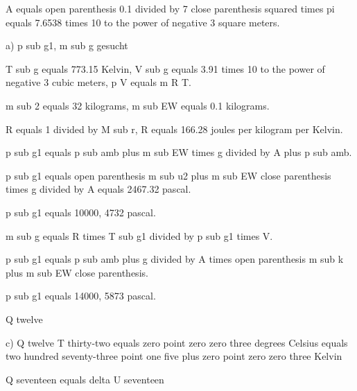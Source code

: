 A equals open parenthesis 0.1 divided by 7 close parenthesis squared times pi equals 7.6538 times 10 to the power of negative 3 square meters.

a) p sub g1, m sub g gesucht

T sub g equals 773.15 Kelvin, V sub g equals 3.91 times 10 to the power of negative 3 cubic meters, p V equals m R T.

m sub 2 equals 32 kilograms, m sub EW equals 0.1 kilograms.

R equals 1 divided by M sub r, R equals 166.28 joules per kilogram per Kelvin.

p sub g1 equals p sub amb plus m sub EW times g divided by A plus p sub amb.

p sub g1 equals open parenthesis m sub u2 plus m sub EW close parenthesis times g divided by A equals 2467.32 pascal.

p sub g1 equals 10000, 4732 pascal.

m sub g equals R times T sub g1 divided by p sub g1 times V.

p sub g1 equals p sub amb plus g divided by A times open parenthesis m sub k plus m sub EW close parenthesis.

p sub g1 equals 14000, 5873 pascal.

Q twelve

c) Q twelve
T thirty-two equals zero point zero zero three degrees Celsius equals two hundred seventy-three point one five plus zero point zero zero three Kelvin

Q seventeen equals delta U seventeen